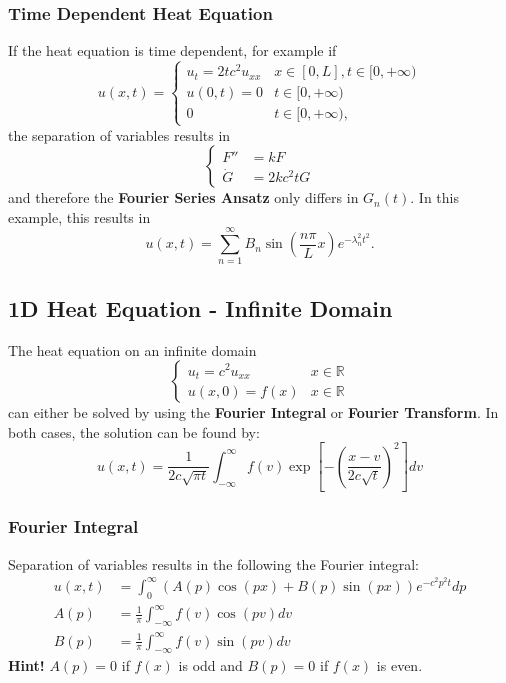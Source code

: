 \subsubsection{Time Dependent Heat Equation}
If the heat equation is time dependent, for example if
\begin{equation*}
    u(x,t)=
    \begin{cases}u_t=2tc^2u_{xx} & x\in[0,L],t\in[0,+\infty) \\%
             u(0,t)=0        & t\in[0,+\infty)           \\%
             0               & t\in[0,+\infty),          %
    \end{cases}
\end{equation*}
the separation of variables results in
\begin{equation*}
    \begin{cases}
        F''     & =kF      \\
        \dot{G} & =2kc^2tG
    \end{cases}
\end{equation*}
and therefore the \textbf{Fourier Series Ansatz} only differs in $G_n(t)$.
In this example, this results in
\begin{equation*}
    u(x,t) =\sum_{n=1}^\infty B_n\sin(\frac{n\pi}Lx)e^{-\lambda_n^2t^2}.
\end{equation*}

\subsection{1D Heat Equation - Infinite Domain}\label{ssec:1d_heat_inf}
The heat equation on an infinite domain
\begin{equation*}
    \begin{cases}
        u_t=c^2u_{xx} & x\in \mathbb{R} \\
        u(x,0)=f(x)   & x\in \mathbb{R}
    \end{cases}
\end{equation*}
can either be solved by using the \textbf{Fourier Integral} or \textbf{Fourier Transform}.
In both cases, the solution can be found by:
\begin{equation*}
    u(x,t)=\frac{1}{2c\sqrt{\pi t}}\int_{-\infty}^{\infty}f(v)\exp\left[-{\left(\frac{x-v}{2c\sqrt{t}}\right)}^{2}\right]dv
\end{equation*}


\subsubsection{Fourier Integral}
Separation of variables results in the following the Fourier integral:
\begin{align*}
    u(x,t) & =\int_0^\infty(A(p)\cos(px)+B(p)\sin(px))e^{-c^2p^2t}dp \\
    A(p)   & =\frac1\pi\int_{-\infty}^\infty f(v)\cos(pv)dv          \\
    B(p)   & =\frac1\pi\int_{-\infty}^\infty f(v)\sin(pv)dv
\end{align*}
\textbf{Hint!} $A(p)=0$ if $f(x)$ is odd and $B(p)=0$ if $f(x)$ is even.


